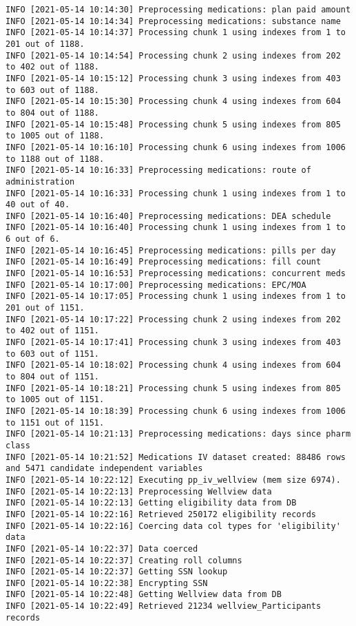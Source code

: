 \documentclass[
]{book}
\begin{document}
\begin{verbatim}
INFO [2021-05-14 10:14:30] Preprocessing medications: plan paid amount
INFO [2021-05-14 10:14:34] Preprocessing medications: substance name
INFO [2021-05-14 10:14:37] Processing chunk 1 using indexes from 1 to 201 out of 1188.
INFO [2021-05-14 10:14:54] Processing chunk 2 using indexes from 202 to 402 out of 1188.
INFO [2021-05-14 10:15:12] Processing chunk 3 using indexes from 403 to 603 out of 1188.
INFO [2021-05-14 10:15:30] Processing chunk 4 using indexes from 604 to 804 out of 1188.
INFO [2021-05-14 10:15:48] Processing chunk 5 using indexes from 805 to 1005 out of 1188.
INFO [2021-05-14 10:16:10] Processing chunk 6 using indexes from 1006 to 1188 out of 1188.
INFO [2021-05-14 10:16:33] Preprocessing medications: route of administration
INFO [2021-05-14 10:16:33] Processing chunk 1 using indexes from 1 to 40 out of 40.
INFO [2021-05-14 10:16:40] Preprocessing medications: DEA schedule
INFO [2021-05-14 10:16:40] Processing chunk 1 using indexes from 1 to 6 out of 6.
INFO [2021-05-14 10:16:45] Preprocessing medications: pills per day
INFO [2021-05-14 10:16:49] Preprocessing medications: fill count
INFO [2021-05-14 10:16:53] Preprocessing medications: concurrent meds
INFO [2021-05-14 10:17:00] Preprocessing medications: EPC/MOA
INFO [2021-05-14 10:17:05] Processing chunk 1 using indexes from 1 to 201 out of 1151.
INFO [2021-05-14 10:17:22] Processing chunk 2 using indexes from 202 to 402 out of 1151.
INFO [2021-05-14 10:17:41] Processing chunk 3 using indexes from 403 to 603 out of 1151.
INFO [2021-05-14 10:18:02] Processing chunk 4 using indexes from 604 to 804 out of 1151.
INFO [2021-05-14 10:18:21] Processing chunk 5 using indexes from 805 to 1005 out of 1151.
INFO [2021-05-14 10:18:39] Processing chunk 6 using indexes from 1006 to 1151 out of 1151.
INFO [2021-05-14 10:21:13] Preprocessing medications: days since pharm class
INFO [2021-05-14 10:21:52] Medications IV dataset created: 88486 rows and 5471 candidate independent variables
INFO [2021-05-14 10:22:12] Executing pp_iv_wellview (mem size 6974).
INFO [2021-05-14 10:22:13] Preprocessing Wellview data
INFO [2021-05-14 10:22:13] Getting eligibility data from DB
INFO [2021-05-14 10:22:16] Retrieved 250172 eligibility records
INFO [2021-05-14 10:22:16] Coercing data col types for 'eligibility' data
INFO [2021-05-14 10:22:37] Data coerced
INFO [2021-05-14 10:22:37] Creating roll columns
INFO [2021-05-14 10:22:37] Getting SSN lookup
INFO [2021-05-14 10:22:38] Encrypting SSN
INFO [2021-05-14 10:22:48] Getting Wellview data from DB
INFO [2021-05-14 10:22:49] Retrieved 21234 wellview_Participants records

\end{verbatim}
\end{document}
